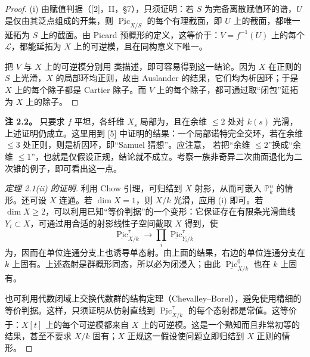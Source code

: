 \begin{proof}
(i) 由赋值判据（[2]，II，\S7），只须证明：若 $S$ 为完备离散赋值环的谱，$U$ 是仅由其泛点组成的开集，则 $\underline{\operatorname{Pic}}_{X/S}$ 的每个有理截面，即 $U$ 上的截面，都唯一延拓为 $S$ 上的截面。由 Picard 预概形的定义，这等价于：$V=f^{-1}(U)$ 上的每个 $\mathcal L$，都能延拓为 $X$ 上的可逆模，且在同构意义下唯一。

把 $V$ 与 $X$ 上的可逆模分别用  类描述，即可容易得到这一结论。因为 $X$ 在正则的 $S$ 上光滑，$X$ 的局部环均正则，故由 Auslander 的结果，它们均为析因环；于是 $X$ 上的每个除子都是 Cartier 除子。而 $V$ 上的每个除子，都可通过取“闭包”延拓为 $X$ 上的除子。
\end{proof}

\textbf{注 2.2。} 只要求 $f$ 平坦，各纤维 $X_s$ 局部为，且在余维 $\leq2$ 处对 $k(s)$ 光滑，上述证明仍成立。这里用到 [5] 中证明的结果：一个局部诺特完全交环，若在余维 $\leq3$ 处正则，则是析因环，即“Samuel 猜想”。应注意，
若把“余维 $\leq2$”换成“余维 $\leq1$”，也就是仅假设正规，结论就不成立。考察一族非奇异二次曲面退化为二次锥的例子，即可看出这一点。

\begin{proof}[定理 2.1(ii) 的证明]
利用 Chow 引理，可归结到 $X$ 射影，从而可嵌入 $\mathbb P_k^n$ 的情形。还可设 $X$ 连通。若 $\dim X=1$，则 $X/k$ 光滑，应用 (i) 即可。若 $\dim X\geq2$，可以利用已知“等价判据”的一个变形：它保证存在有限条光滑曲线 $Y_i\subset X$，可通过用合适的射影线性子空间截取 $X$ 得到，使
\[
 \underline{\operatorname{Pic}}^\tau_{X/k}
 \longrightarrow\prod_i\underline{\operatorname{Pic}}^\tau_{Y_i/k}
\]
为，因而在单位连通分支上也诱导单态射。由上面的结果，右边的单位连通分支在 $k$ 上固有。上述态射是群概形同态，所以必为闭浸入；由此 $\underline{\operatorname{Pic}}^0_{X/k}$ 也在 $k$ 上固有。

也可利用代数闭域上交换代数群的结构定理（Chevalley--Borel），避免使用精细的等价判据。这样，只须证明从仿射直线到 $\underline{\operatorname{Pic}}^\tau_{X/k}$ 的每个态射都是常值。这等价于：$X[t]$ 上的每个可逆模都来自 $X$ 上的可逆模。这是一个熟知而且非常初等的结果，甚至不要求 $X/k$ 固有；$X$ 正规这一假设使问题立即归结到 $X$ 正则的情形。
\end{proof}

